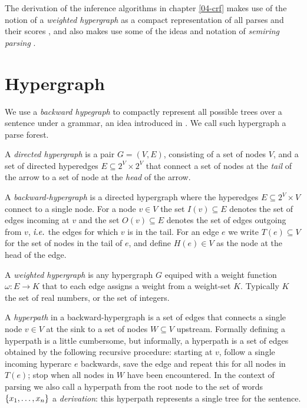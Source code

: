 The derivation of the inference algorithms in chapter \ref{04-crf} makes use of the notion of a \textit{weighted hypergraph} as a compact representation of all parses and their scores \citep{gallo1993directed,klein2004parsing}, and also makes use some of the ideas and notation of \textit{semiring parsing} \citep{goodman1999semiring,eisner2009semirings}.

\section{Hypergraph}
  We use a \textit{backward hypegraph} to compactly represent all possible trees over a sentence under a grammar, an idea introduced in \citet{klein2004parsing}. We call such hypergraph a parse forest.

  \begin{definition}{}
    A \textit{directed hypergraph} is a pair $G = (V, E)$, consisting of a set of nodes $V$, and a set of directed hyperedges $E \subseteq 2^V \times 2^V$ that connect a set of nodes at the \textit{tail} of the arrow to a set of node at the \textit{head} of the arrow.
  \end{definition}

  \begin{definition}{}
    A \textit{backward-hypergraph} is a directed hypergraph where the hyperedges $E \subseteq 2^V \times V$ connect to a single node. For a node $v \in V$ the set $I(v) \subseteq E$ denotes the set of edges incoming at $v$ and the set $O(v) \subseteq E$ denotes the set of edges outgoing from $v$, $\emph{i.e.}$ the edges for which $v$ is in the tail. For an edge $e$ we write $T(e) \subseteq V$ for the set of nodes in the tail of $e$, and define $H(e) \in V$ as the node at the head of the edge.
  \end{definition}

  \begin{definition}{}
     A \textit{weighted hypergraph} is any hypergraph $G$ equiped with a weight function $\omega : E \to K$ that to each edge assigns a weight from a weight-set $K$. Typically $K$ the set of real numbers, or the set of integers.
  \end{definition}

  \begin{definition}{}
    A \textit{hyperpath} in a backward-hypergraph is a set of edges that connects a single node $v \in V$ at the sink to a set of nodes $W \subseteq V$ upstream. Formally defining a hyperpath is a little cumbersome, but informally, a hyperpath is a set of edges obtained by the following recursive procedure: starting at $v$, follow a single incoming hyperarc $e$ backwards, save the edge and repeat this for all nodes in $T(e)$; stop when all nodes in $W$ have been encountered. In the context of parsing we also call a hyperpath from the root node to the set of words $\{ x_1, \dots, x_n \}$ a \textit{derivation}: this hyperpath represents a single tree for the sentence.
  \end{definition}

